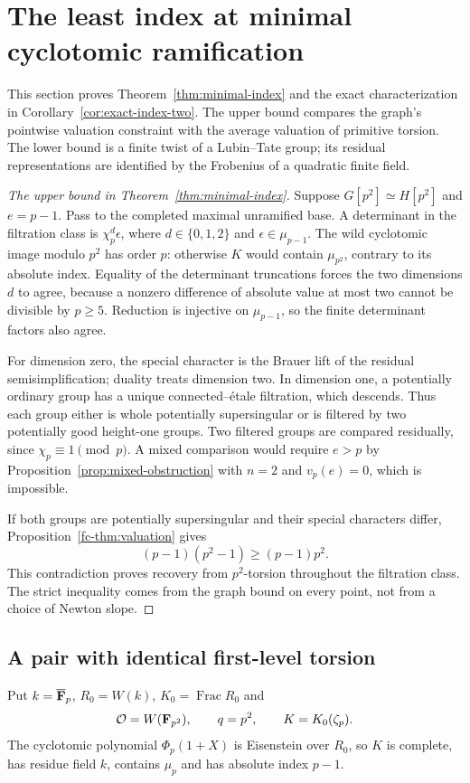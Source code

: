 \section{The least index at minimal cyclotomic ramification}\label{sec:minimal-index}
This section proves Theorem~\ref{thm:minimal-index} and the exact characterization in Corollary~\ref{cor:exact-index-two}. The upper bound compares the graph's pointwise valuation constraint with the average valuation of primitive torsion. The lower bound is a finite twist of a Lubin--Tate group; its residual representations are identified by the Frobenius of a quadratic finite field.

\begin{proof}[The upper bound in Theorem~\ref{thm:minimal-index}]
Suppose $G[p^2]\simeq H[p^2]$ and $e=p-1$. Pass to the completed maximal unramified base. A determinant in the filtration class is $\chi_p^d\epsilon$, where $d\in\{0,1,2\}$ and $\epsilon\in\mu_{p-1}$. The wild cyclotomic image modulo $p^2$ has order $p$: otherwise $K$ would contain $\mu_{p^2}$, contrary to its absolute index. Equality of the determinant truncations forces the two dimensions $d$ to agree, because a nonzero difference of absolute value at most two cannot be divisible by $p\ge5$. Reduction is injective on $\mu_{p-1}$, so the finite determinant factors also agree.

For dimension zero, the special character is the Brauer lift of the residual semisimplification; duality treats dimension two. In dimension one, a potentially ordinary group has a unique connected--\'etale filtration, which descends. Thus each group either is whole potentially supersingular or is filtered by two potentially good height-one groups. Two filtered groups are compared residually, since $\chi_p\equiv1\pmod p$. A mixed comparison would require $e>p$ by Proposition~\ref{prop:mixed-obstruction} with $n=2$ and $v_p(e)=0$, which is impossible.

If both groups are potentially supersingular and their special characters differ, Proposition~\ref{fc-thm:valuation} gives
\[
 (p-1)(p^2-1)\ge(p-1)p^2.
\]
This contradiction proves recovery from $p^2$-torsion throughout the filtration class. The strict inequality comes from the graph bound on every point, not from a choice of Newton slope.
\end{proof}

\subsection{A pair with identical first-level torsion}
Put $k=\overline{\mathbf F}_p$, $R_0=W(k)$, $K_0=\operatorname{Frac}R_0$ and
\[
 \mathcal O=W(\mathbf F_{p^2}),\qquad q=p^2,
 \qquad K=K_0(\zeta_p).
\]
The cyclotomic polynomial $\Phi_p(1+X)$ is Eisenstein over $R_0$, so $K$ is complete, has residue field $k$, contains $\mu_p$ and has absolute index $p-1$.

